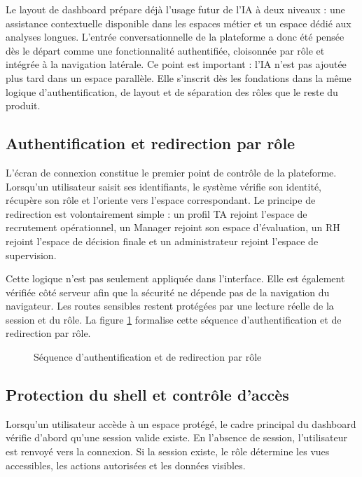 Le layout de dashboard prépare déjà l'usage futur de l'IA à deux niveaux : une assistance contextuelle disponible dans les espaces métier et un espace dédié aux analyses longues. L'entrée conversationnelle de la plateforme a donc été pensée dès le départ comme une fonctionnalité authentifiée, cloisonnée par rôle et intégrée à la navigation latérale.
Ce point est important : l'IA n'est pas ajoutée plus tard dans un espace parallèle. Elle s'inscrit dès les fondations dans la même logique d'authentification, de layout et de séparation des rôles que le reste du produit.

\subsection{Authentification et redirection par rôle}
L'écran de connexion constitue le premier point de contrôle de la plateforme. Lorsqu'un utilisateur saisit ses identifiants, le système vérifie son identité, récupère son rôle et l'oriente vers l'espace correspondant. Le principe de redirection est volontairement simple : un profil TA rejoint l'espace de recrutement opérationnel, un Manager rejoint son espace d'évaluation, un RH rejoint l'espace de décision finale et un administrateur rejoint l'espace de supervision.

Cette logique n'est pas seulement appliquée dans l'interface. Elle est également vérifiée côté serveur afin que la sécurité ne dépende pas de la navigation du navigateur. Les routes sensibles restent protégées par une lecture réelle de la session et du rôle.
La figure \ref{fig:auth-role-sequence} formalise cette séquence d'authentification et de redirection par rôle.

\begin{figure}[H]
  \centering
  \caption{\label{fig:auth-role-sequence}Séquence d'authentification et de redirection par rôle}
\end{figure}

\subsection{Protection du shell et contrôle d'accès}
Lorsqu'un utilisateur accède à un espace protégé, le cadre principal du dashboard vérifie d'abord qu'une session valide existe. En l'absence de session, l'utilisateur est renvoyé vers la connexion. Si la session existe, le rôle détermine les vues accessibles, les actions autorisées et les données visibles.

